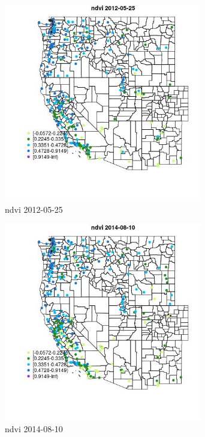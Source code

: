 \begin{figure} 
\centering  
\includegraphics[width=0.77\textwidth]{Code_Outputs/Report_ML_input_PM25_Step4_part_e_de_duplicated_aves_compiled_2019-05-18wNAs_MapObsndvi2012-05-25.jpg} 
\caption{\label{fig:Report_ML_input_PM25_Step4_part_e_de_duplicated_aves_compiled_2019-05-18wNAsMapObsndvi2012-05-25}ndvi 2012-05-25} 
\end{figure} 
 

\begin{figure} 
\centering  
\includegraphics[width=0.77\textwidth]{Code_Outputs/Report_ML_input_PM25_Step4_part_e_de_duplicated_aves_compiled_2019-05-18wNAs_MapObsndvi2014-08-10.jpg} 
\caption{\label{fig:Report_ML_input_PM25_Step4_part_e_de_duplicated_aves_compiled_2019-05-18wNAsMapObsndvi2014-08-10}ndvi 2014-08-10} 
\end{figure} 
 

